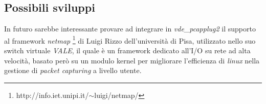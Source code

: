 \subsection{Possibili sviluppi}
In futuro sarebbe interessante provare ad integrare in {\em vde\_pcapplug2} il supporto al framework {\em netmap} \footnote{http://info.iet.unipi.it/$\sim$luigi/netmap/} di Luigi Rizzo dell'università di Pisa, utilizzato nello suo switch virtuale {\em VALE}, il quale è un framework dedicato all'I/O su rete ad alta velocità, basato però su un modulo kernel per migliorare l'efficienza di {\em linux} nella gestione di {\em packet capturing} a livello utente.